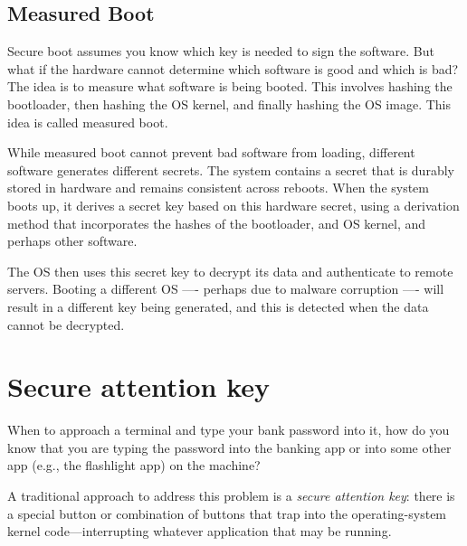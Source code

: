 \documentclass[
  letterpaper,
]{scrbook}
\theoremstyle{definition}
\theoremstyle{plain}
\theoremstyle{plain}
\theoremstyle{remark}
\begin{document}

\subsection{Measured Boot}\label{measured-boot}

Secure boot assumes you know which key is needed to sign the software.
But what if the hardware cannot determine which software is good and
which is bad? The idea is to measure what software is being booted. This
involves hashing the bootloader, then hashing the OS kernel, and finally
hashing the OS image. This idea is called measured boot.

While measured boot cannot prevent bad software from loading, different
software generates different secrets. The system contains a secret that
is durably stored in hardware and remains consistent across reboots.
When the system boots up, it derives a secret key based on this hardware
secret, using a derivation method that incorporates the hashes of the
bootloader, and OS kernel, and perhaps other software.

The OS then uses this secret key to decrypt its data and authenticate to
remote servers. Booting a different OS ---- perhaps due to malware
corruption ---- will result in a different key being generated, and this
is detected when the data cannot be decrypted.

\section{Secure attention key}\label{secure-attention-key}

When to approach a terminal and type your bank password into it, how do
you know that you are typing the password into the banking app or into
some other app (e.g., the flashlight app) on the machine?

A traditional approach to address this problem is a \emph{secure
attention key}: there is a special button or combination of buttons that
trap into the operating-system kernel code---interrupting whatever
application that may be running.
\end{document}
